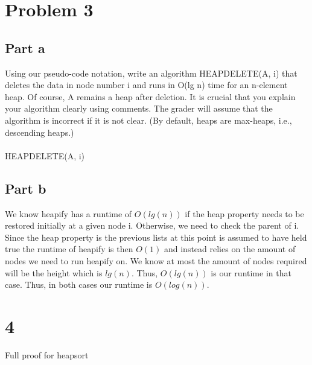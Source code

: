 \documentclass{article}
\begin{document}
\section*{Problem 3}
\subsection*{Part a}

Using our pseudo-code notation, write an algorithm HEAPDELETE(A, i) that
deletes the data in node number i and runs in O(lg n) time for an n-element
heap. Of course, A remains a heap after deletion.
It is crucial that you explain your algorithm clearly using comments. The grader
will assume that the algorithm is incorrect if it is not clear.
(By default, heaps are max-heaps, i.e., descending heaps.)\\\\

HEAPDELETE(A, i)
\begin{algorithmic}[1]
     
     
     
         
         
\end{algorithmic}

\subsection*{Part b}
We know heapify has a runtime of $O(lg(n))$ if the heap property 
needs to be restored initially at a given node i. Otherwise, 
we need to check the parent of i. Since the heap property is the 
previous lists at this point is assumed to have held true the 
runtime of heapify is then $O(1)$ and instead relies on the 
amount of nodes we need to run heapify on. We know at most 
the amount of nodes required will be the height which is $lg(n)$.
Thus, $O(lg(n))$ is our runtime in that case. Thus, in both cases 
our runtime is $O(log(n))$.\\


\section*{4}
Full proof for heapsort\\\\
\end{document}
